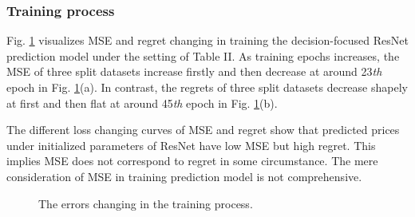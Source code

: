 \documentclass[journal]{IEEEtran}
\begin{document}
\subsubsection{Training process}
Fig. \ref{Training_process} visualizes MSE and regret changing in training the decision-focused ResNet prediction model under the setting of Table II. As training epochs increases, the MSE of three split datasets increase firstly and then decrease at around 23\textit{th} epoch in Fig. \ref{Training_process}(a). In contrast, the regrets of three split datasets decrease shapely at first and then flat at around 45\textit{th} epoch in Fig. \ref{Training_process}(b). 

The different loss changing curves of MSE and regret show that predicted prices under initialized parameters of ResNet have low MSE but high regret. This implies MSE does not correspond to regret in some circumstance. The mere consideration of MSE in training prediction model is not comprehensive.

\begin{figure}[ht]
  \centering
  \qquad
  \caption{The errors changing in the training process.}
  \label{Training_process}
\end{figure}
\end{document}
